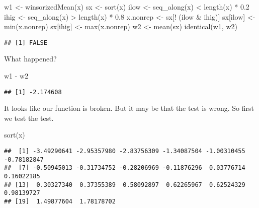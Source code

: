\documentclass[
]{article}
\newenvironment{Shaded}{\begin{snugshade}}{\end{snugshade}}
\newcommand{\FloatTok}[1]{\textcolor[rgb]{0.00,0.00,0.81}{#1}}
\newcommand{\FunctionTok}[1]{\textcolor[rgb]{0.00,0.00,0.00}{#1}}
\newcommand{\NormalTok}[1]{#1}
\newcommand{\OtherTok}[1]{\textcolor[rgb]{0.56,0.35,0.01}{#1}}
\newcommand{\SpecialCharTok}[1]{\textcolor[rgb]{0.00,0.00,0.00}{#1}}
\begin{document}
\begin{Shaded}
\begin{Highlighting}[]
\NormalTok{w1 }\OtherTok{\textless{}{-}} \FunctionTok{winsorizedMean}\NormalTok{(x)}
\NormalTok{sx }\OtherTok{\textless{}{-}} \FunctionTok{sort}\NormalTok{(x)}
\NormalTok{ilow }\OtherTok{\textless{}{-}} \FunctionTok{seq\_along}\NormalTok{(x) }\SpecialCharTok{\textless{}} \FunctionTok{length}\NormalTok{(x) }\SpecialCharTok{*} \FloatTok{0.2}
\NormalTok{ihig }\OtherTok{\textless{}{-}} \FunctionTok{seq\_along}\NormalTok{(x) }\SpecialCharTok{\textgreater{}} \FunctionTok{length}\NormalTok{(x) }\SpecialCharTok{*} \FloatTok{0.8}
\NormalTok{x.nonrep }\OtherTok{\textless{}{-}}\NormalTok{ sx[}\SpecialCharTok{!}\NormalTok{ (ilow }\SpecialCharTok{\&}\NormalTok{ ihig)]}
\NormalTok{sx[ilow] }\OtherTok{\textless{}{-}} \FunctionTok{min}\NormalTok{(x.nonrep)}
\NormalTok{sx[ihig] }\OtherTok{\textless{}{-}} \FunctionTok{max}\NormalTok{(x.nonrep)}
\NormalTok{w2 }\OtherTok{\textless{}{-}} \FunctionTok{mean}\NormalTok{(sx)}
\FunctionTok{identical}\NormalTok{(w1, w2)}
\end{Highlighting}
\end{Shaded}

\begin{verbatim}
## [1] FALSE
\end{verbatim}

What happened?

\begin{Shaded}
\begin{Highlighting}[]
\NormalTok{w1 }\SpecialCharTok{{-}}\NormalTok{ w2}
\end{Highlighting}
\end{Shaded}

\begin{verbatim}
## [1] -2.174608
\end{verbatim}

It looks like our function is broken. But it may be that the test is
wrong. So first we test the test.

\begin{Shaded}
\begin{Highlighting}[]
\FunctionTok{sort}\NormalTok{(x)}
\end{Highlighting}
\end{Shaded}

\begin{verbatim}
##  [1] -3.49290641 -2.95357980 -2.83756309 -1.34087504 -1.00310455 -0.78182847
##  [7] -0.50945013 -0.31734752 -0.28206969 -0.11876296  0.03776714  0.16022185
## [13]  0.30327340  0.37355389  0.58092897  0.62265967  0.62524329  0.98139727
## [19]  1.49877604  1.78178702
\end{verbatim}
\end{document}
